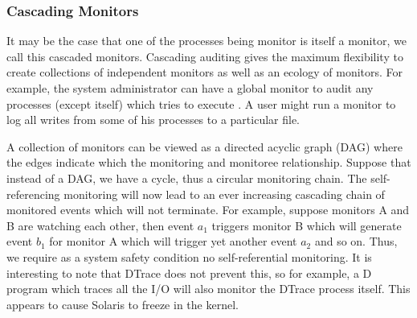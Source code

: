 

\subsubsection{Cascading Monitors}
\label{sec:lbox-self}

It may be the case that one of the processes being monitor is
itself a monitor, we call this cascaded monitors.
Cascading auditing gives the maximum flexibility to create 
collections of independent monitors as well as an ecology
of monitors.
For example, the system administrator can have a global monitor to
audit any processes (except itself) which
tries to execute . 
A user might run a monitor to log all writes 
from some of his processes to a particular file.

A collection of monitors can be viewed as a directed acyclic graph (DAG)
where the edges indicate which the monitoring and monitoree relationship.
Suppose that instead of a DAG, we have a cycle, 
thus a circular monitoring chain. 
The self-referencing monitoring will now lead to an ever increasing cascading
chain of monitored events which will not terminate.
For example, suppose monitors A and B are watching each other, then
event $a_1$ triggers monitor B which will generate event $b_1$ for monitor
A which will trigger yet another event $a_2$ and so on.
Thus, we require as a system safety condition no self-referential monitoring.
It is interesting to note that DTrace does not prevent this, so for example,
a D program which traces all the  I/O will also monitor the DTrace
process itself. This appears to cause Solaris to freeze in the kernel.


